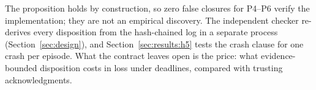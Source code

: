The proposition holds by construction, so zero false closures for P4--P6 verify the implementation; they are not an empirical discovery. The independent checker re-derives every disposition from the hash-chained log in a separate process (Section~\ref{sec:design}), and Section~\ref{sec:results:h5} tests the crash clause for one crash per episode. What the contract leaves open is the price: what evidence-bounded disposition costs in loss under deadlines, compared with trusting acknowledgments.
